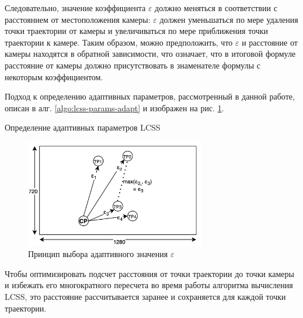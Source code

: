 Следовательно, значение коэффициента $\varepsilon$ должно меняться в соответствии с расстоянием от местоположения камеры: $\varepsilon$ должен уменьшаться по мере удаления точки траектории от камеры и увеличиваться по мере приближения точки траектории к камере. Таким образом, можно предположить, что $\varepsilon$ и расстояние от камеры находятся в обратной зависимости, что означает, что в итоговой формуле расстояние от камеры должно присутствовать в знаменателе формулы с некоторым коэффициентом.

Подход к определению адаптивных параметров, рассмотренный в данной работе, описан в алг. \ref{algo:lcss-params-adapt} и изображен на рис. \ref{fig:adaptivity}.

\begin{algorithm}[!htb]
	\caption{Определение адаптивных параметров LCSS}
	\label{algo:lcss-params-adapt}
	\SetAlgoLined
\end{algorithm}

\begin{figure}[!htb]
	\centering{}
	\includegraphics[width=0.7\textwidth]{images/adaptivity.png}
	\caption{Принцип выбора адаптивного значения $\varepsilon$}
	\label{fig:adaptivity}
\end{figure}

Чтобы оптимизировать подсчет расстояния от точки траектории до точки камеры и избежать его многократного пересчета во время работы алгоритма вычисления LCSS, это расстояние рассчитывается заранее и сохраняется для каждой точки траектории.

